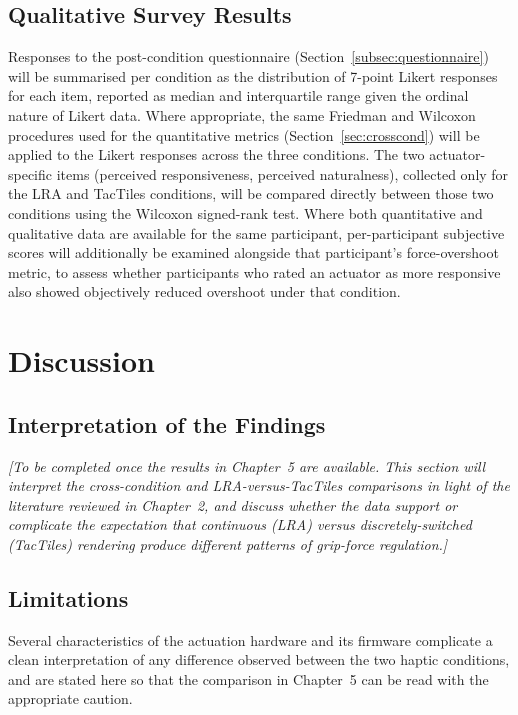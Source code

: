 \documentclass[12pt, a4paper]{report}
\begin{document}
\section{Qualitative Survey Results}
Responses to the post-condition questionnaire (Section~\ref{subsec:questionnaire}) will be summarised per condition as the distribution of 7-point Likert responses for each item, reported as median and interquartile range given the ordinal nature of Likert data. Where appropriate, the same Friedman and Wilcoxon procedures used for the quantitative metrics (Section~\ref{sec:crosscond}) will be applied to the Likert responses across the three conditions. The two actuator-specific items (perceived responsiveness, perceived naturalness), collected only for the LRA and TacTiles conditions, will be compared directly between those two conditions using the Wilcoxon signed-rank test. Where both quantitative and qualitative data are available for the same participant, per-participant subjective scores will additionally be examined alongside that participant's force-overshoot metric, to assess whether participants who rated an actuator as more responsive also showed objectively reduced overshoot under that condition.

\chapter{Discussion}
\label{ch:discussion}
\section{Interpretation of the Findings}
\textit{[To be completed once the results in Chapter~5 are available. This section will interpret the cross-condition and LRA-versus-TacTiles comparisons in light of the literature reviewed in Chapter~2, and discuss whether the data support or complicate the expectation that continuous (LRA) versus discretely-switched (TacTiles) rendering produce different patterns of grip-force regulation.]}

\section{Limitations}
Several characteristics of the actuation hardware and its firmware complicate a clean interpretation of any difference observed between the two haptic conditions, and are stated here so that the comparison in Chapter~5 can be read with the appropriate caution.
\end{document}

